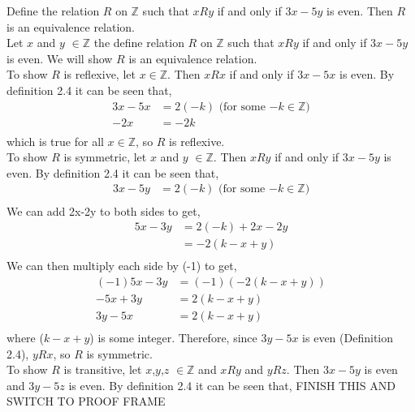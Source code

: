 \documentclass[12pt]{article}
\newenvironment{theorem}[2][Theorem]{\begin{trivlist}
\item[\hskip \labelsep {\bfseries #1}\hskip \labelsep {\bfseries #2.}]}{\end{trivlist}}
\begin{document}
\begin{theorem}3
	Define the relation $R$ on $\mathbb{Z}$ such that $xRy$ if and only if $3x-5y$ is even. Then $R$ is an equivalence relation.\\

	Let $x$ and $y$ $\in \mathbb{Z}$ the define relation $R$ on $\mathbb{Z}$ such that $xRy$ if and only if $3x-5y$ is even. We will show $R$ is an equivalence relation.\\

	To show $R$ is reflexive, let $x \in \mathbb{Z}$. Then $xRx$ if and only if $3x-5x$ is even. By definition 2.4 it can be seen that,
	\begin{align*}
		3x-5x &= 2(-k) \text{ (for some $-k \in \mathbb{Z}$)}\\
		-2x &= -2k\\
	\end{align*}
	which is true for all $x \in \mathbb{Z}$, so $R$ is reflexive.\\

	To show $R$ is symmetric, let $x$ and $y$ $\in \mathbb{Z}$. Then $xRy$ if and only if $3x-5y$ is even. By definition 2.4 it can be seen that,
	\begin{align*}
		3x-5y &= 2(-k) \text{ (for some $-k \in \mathbb{Z}$)}\\
	\end{align*}
	We can add 2x-2y to both sides to get,
	\begin{align*}
		5x-3y &= 2(-k) + 2x-2y\\
		      &= -2(k-x+y)\\
	\end{align*}
	We can then multiply each side by (-1) to get,
	\begin{align*}
		(-1)5x-3y &= (-1)(-2(k-x+y))\\
		-5x+3y&= 2(k-x+y)\\
		3y-5x &= 2(k-x+y)\\
	\end{align*}
	where ($k-x+y$) is some integer. Therefore, since $3y-5x$ is even (Definition 2.4), $yRx$, so
	$R$ is symmetric.\\

	To show $R$ is transitive, let $x$,$y$,$z$ $\in \mathbb{Z}$ and $xRy$ and $yRz$. 
	Then $3x-5y$ is even and $3y-5z$ is even. By definition 2.4 it can be seen that,
	FINISH THIS AND SWITCH TO PROOF FRAME



	
\end{theorem}
\end{document}
